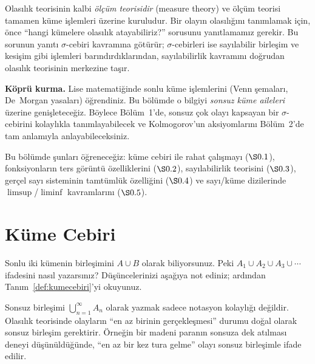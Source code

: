 \begin{motivasyon}
Olasılık teorisinin kalbi \emph{ölçüm teorisidir} (measure theory) ve ölçüm
teorisi tamamen küme işlemleri üzerine kuruludur. Bir olayın olasılığını
tanımlamak için, önce ``hangi kümelere olasılık atayabiliriz?'' sorusunu
yanıtlamamız gerekir. Bu sorunun yanıtı $\sigma$-cebiri kavramına götürür;
$\sigma$-cebirleri ise sayılabilir birleşim ve kesişim gibi işlemleri
barındırdıklarından, sayılabilirlik kavramını doğrudan olasılık teorisinin
merkezine taşır.

\medskip

\textbf{Köprü kurma.} Lise matematiğinde sonlu küme işlemlerini (Venn
şemaları, De~Morgan yasaları) öğrendiniz. Bu bölümde o bilgiyi \emph{sonsuz
küme aileleri} üzerine genişleteceğiz. Böylece Bölüm~1'de, sonsuz çok olayı
kapsayan bir $\sigma$-cebirini kolaylıkla tanımlayabilecek ve Kolmogorov'un
aksiyomlarını Bölüm~2'de tam anlamıyla anlayabileceksiniz.

\medskip

Bu bölümde şunları öğreneceğiz:
küme cebiri ile rahat çalışmayı ($\S0.1$),
fonksiyonların ters görüntü özelliklerini ($\S0.2$),
sayılabilirlik teorisini ($\S0.3$),
gerçel sayı sisteminin tamtümlük özelliğini ($\S0.4$)
ve sayı/küme dizilerinde $\limsup$/$\liminf$ kavramlarını ($\S0.5$).
\end{motivasyon}


\section{Küme Cebiri}

\begin{kesif}
Sonlu iki kümenin birleşimini $A \cup B$ olarak biliyorsunuz. Peki
$A_1 \cup A_2 \cup A_3 \cup \cdots$ ifadesini nasıl yazarsınız?
Düşüncelerinizi aşağıya not ediniz; ardından Tanım~\ref{def:kumecebiri}'yi
okuyunuz.
\end{kesif}

\begin{tanimgerekce}
Sonsuz birleşimi $\bigcup_{n=1}^\infty A_n$ olarak yazmak sadece notasyon
kolaylığı değildir. Olasılık teorisinde olayların ``en az birinin gerçekleşmesi''
durumu doğal olarak sonsuz birleşim gerektirir. Örneğin bir madeni paranın
sonsuza dek atılması deneyi düşünüldüğünde, ``en az bir kez tura gelme'' olayı
sonsuz birleşimle ifade edilir.
\end{tanimgerekce}

